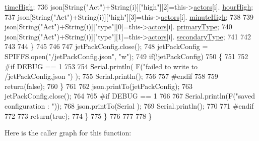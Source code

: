 \begin{DoxyCode}
      \hyperlink{struct_jetpack_1_1state_a97c594b20b03b46ae0a6ac544f5d6c8d}{timeHigh};
736                 json[String(\textcolor{stringliteral}{"Act"})+String(i)][\textcolor{stringliteral}{"high"}][2]=this->\hyperlink{class_jetpack_a7e16d2f97837f9712a2e6de1c50d99db}{actors}[i].
      \hyperlink{struct_jetpack_1_1state_ace824f4ae57fa1a4a27b2c6477b350e3}{hourHigh};
737                 json[String(\textcolor{stringliteral}{"Act"})+String(i)][\textcolor{stringliteral}{"high"}][3]=this->\hyperlink{class_jetpack_a7e16d2f97837f9712a2e6de1c50d99db}{actors}[i].
      \hyperlink{struct_jetpack_1_1state_a8c26c18b0ec449b7545934cb01cca028}{minuteHigh};
738 
739                 json[String(\textcolor{stringliteral}{"Act"})+String(i)][\textcolor{stringliteral}{"type"}][0]=this->\hyperlink{class_jetpack_a7e16d2f97837f9712a2e6de1c50d99db}{actors}[i].
      \hyperlink{struct_jetpack_1_1state_aa6242c32eb0ab42aaea170636ab949e1}{primaryType};
740                 json[String(\textcolor{stringliteral}{"Act"})+String(i)][\textcolor{stringliteral}{"type"}][1]=this->\hyperlink{class_jetpack_a7e16d2f97837f9712a2e6de1c50d99db}{actors}[i].
      \hyperlink{struct_jetpack_1_1state_a81cf9af139da095b7d91e2a87e50135b}{secondaryType};
741 
742 
743 
744             \}
745             
746 
747             jetPackConfig.close();          
748             jetPackConfig = SPIFFS.open(\textcolor{stringliteral}{"/jetPackConfig.json"}, \textcolor{stringliteral}{"w"});            
749             \textcolor{keywordflow}{if}(!jetPackConfig)
750             \{
751             
752 \textcolor{preprocessor}{            #if DEBUG == 1 }
753 
754                 Serial.println( F(\textcolor{stringliteral}{"failed to write to /jetPackConfig.json "}) );
755                 Serial.println();
756             
757 \textcolor{preprocessor}{            #endif}
758                 
759                 \textcolor{keywordflow}{return}(\textcolor{keyword}{false});          
760             \}  
761 
762             json.printTo(jetPackConfig);
763             jetPackConfig.close();
764 
765 \textcolor{preprocessor}{        #if DEBUG == 1 }
766             
767             Serial.println(F(\textcolor{stringliteral}{"saved configuration : "}));
768             json.printTo(Serial );
769             Serial.println();       
770         
771 \textcolor{preprocessor}{        #endif}
772 
773             \textcolor{keywordflow}{return}(\textcolor{keyword}{true}); 
774         \}
775     \}   
776     
777 
778 \}
\end{DoxyCode}
Here is the caller graph for this function\+:\nopagebreak
